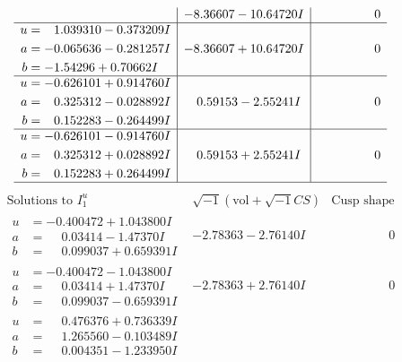 \documentclass[1p]{elsarticle_modified}
\theoremstyle{definition}
\newcommand{\I}{\sqrt{-1}}
\begin{document}
$$\begin{array}{c|c|c}
 & -8.36607 - 10.64720 I & \phantom{-0.000000 } 0 \\ \hline\begin{aligned}
u &= \phantom{-}1.039310 - 0.373209 I \\
a &= -0.065636 - 0.281257 I \\
b &= -1.54296 + 0.70662 I\end{aligned}
 & -8.36607 + 10.64720 I & \phantom{-0.000000 } 0 \\ \hline\begin{aligned}
u &= -0.626101 + 0.914760 I \\
a &= \phantom{-}0.325312 - 0.028892 I \\
b &= \phantom{-}0.152283 - 0.264499 I\end{aligned}
 & \phantom{-}0.59153 - 2.55241 I & \phantom{-0.000000 } 0 \\ \hline\begin{aligned}
u &= -0.626101 - 0.914760 I \\
a &= \phantom{-}0.325312 + 0.028892 I \\
b &= \phantom{-}0.152283 + 0.264499 I\end{aligned}
 & \phantom{-}0.59153 + 2.55241 I & \phantom{-0.000000 } 0\\
 \hline 
 \end{array}$$\newpage$$\begin{array}{c|c|c}  
\text{Solutions to }I^u_{1}& \I (\text{vol} + \sqrt{-1}CS) & \text{Cusp shape}\\
 \hline 
\begin{aligned}
u &= -0.400472 + 1.043800 I \\
a &= \phantom{-}0.03414 - 1.47370 I \\
b &= \phantom{-}0.099037 + 0.659391 I\end{aligned}
 & -2.78363 - 2.76140 I & \phantom{-0.000000 } 0 \\ \hline\begin{aligned}
u &= -0.400472 - 1.043800 I \\
a &= \phantom{-}0.03414 + 1.47370 I \\
b &= \phantom{-}0.099037 - 0.659391 I\end{aligned}
 & -2.78363 + 2.76140 I & \phantom{-0.000000 } 0 \\ \hline\begin{aligned}
u &= \phantom{-}0.476376 + 0.736339 I \\
a &= \phantom{-}1.265560 - 0.103489 I \\
b &= \phantom{-}0.004351 - 1.233950 I\end{aligned}

\end{array}$$
\end{document}
